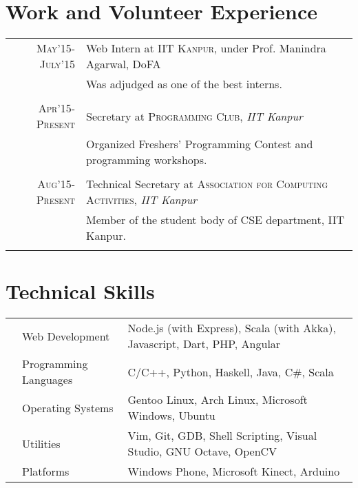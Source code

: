 \documentclass[11pt,a4paper]{article}
\begin{document}
\vspace{-0.6cm}
\section*{Work and Volunteer Experience}
\vspace{-0.2cm}
\bgroup
\def\arraystretch{0.6}
\begin{tabular}{r|p{20cm}}
\textsc{May'15-July'15} & Web Intern at \textsc{IIT Kanpur}, under Prof. Manindra Agarwal, DoFA\\
                        &\footnotesize{Was adjudged as one of the best interns.}\\\multicolumn{2}{c}{} \\
\textsc{Apr'15-Present} & Secretary at \textsc{Programming Club}, \emph{IIT Kanpur}\\
&\footnotesize{Organized Freshers' Programming Contest and programming workshops.}\\\multicolumn{2}{c}{} \\

\textsc{Aug'15-Present} & Technical Secretary at \textsc{Association for Computing Activities}, \emph{IIT Kanpur}\\
&\footnotesize{Member of the student body of CSE department, IIT Kanpur.}\\\multicolumn{2}{c}{} \\

\end{tabular}
\egroup

\vspace{-0.6cm}
\section*{Technical Skills}
\vspace{-0.2cm}
\begin{tabular}{L{0.05cm} L{5cm} l}
  &Web Development 	          &Node.js (with Express), Scala (with Akka), Javascript, Dart, PHP, Angular\\
  &Programming Languages      &C/C++, Python, Haskell, Java, C\#, Scala\\
  &Operating Systems	        &Gentoo Linux, Arch Linux, Microsoft Windows, Ubuntu\\
  &Utilities                  &Vim, Git, GDB, Shell Scripting, Visual Studio, GNU Octave, OpenCV\\
  &Platforms                  &Windows Phone, Microsoft Kinect, Arduino\\
\end{tabular}
\end{document}
